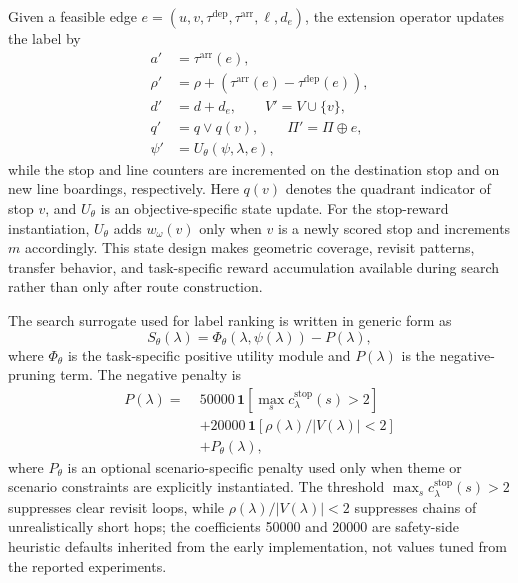 Given a feasible edge
\(e=(u,v,\tau^{\mathrm{dep}},\tau^{\mathrm{arr}},\ell,d_e)\),
the extension operator updates the label by
\begin{equation}
    \label{eq:extend}
    \begin{aligned}
        a'    & = \tau^{\mathrm{arr}}(e),                                            \\
        \rho' & = \rho + \left(\tau^{\mathrm{arr}}(e)-\tau^{\mathrm{dep}}(e)\right), \\
        d'    & = d + d_e,\qquad
        V' = V \cup \{v\},                                                           \\
        q'    & = q \vee q(v),\qquad
        \Pi' = \Pi \oplus e,                                                         \\
        \psi' & = U_{\theta}(\psi,\lambda,e),
    \end{aligned}
\end{equation}
while the stop and line counters are incremented on the destination stop and on
new line boardings, respectively.
Here \(q(v)\) denotes the quadrant indicator of stop \(v\), and
\(U_{\theta}\) is an objective-specific state update. For the stop-reward
instantiation, \(U_{\theta}\) adds \(w_{\omega}(v)\) only when \(v\) is a newly
scored stop and increments \(m\) accordingly. This state design makes
geometric coverage, revisit patterns, transfer behavior, and task-specific
reward accumulation available during search rather than only after route
construction.

The search surrogate used for label ranking is written in generic form as
\begin{equation}
    \label{eq:search_score}
    S_{\theta}(\lambda) =
    \Phi_{\theta}\!\left(\lambda,\psi(\lambda)\right) - P(\lambda),
\end{equation}
where \(\Phi_{\theta}\) is the task-specific positive utility module and
\(P(\lambda)\) is the negative-pruning term. The negative penalty is
\begin{equation}
    \label{eq:negative_penalty}
    \begin{aligned}
        P(\lambda)
        =\; & 50000\,\mathbf{1}\!\left[\max_{s} c^{\mathrm{stop}}_{\lambda}(s) > 2\right] \\
            & + 20000\,\mathbf{1}\!\left[\rho(\lambda) / |V(\lambda)| < 2\right]          \\
            & + P_{\theta}(\lambda),
    \end{aligned}
\end{equation}
where \(P_{\theta}\) is an optional scenario-specific penalty used only when
theme or scenario constraints are explicitly instantiated. The threshold
\(\max_s c^{\mathrm{stop}}_{\lambda}(s)>2\) suppresses clear revisit loops,
while \(\rho(\lambda)/|V(\lambda)|<2\) suppresses chains of unrealistically
short hops; the coefficients 50000 and 20000 are safety-side heuristic
defaults inherited from the early implementation, not values tuned from the
reported experiments.

